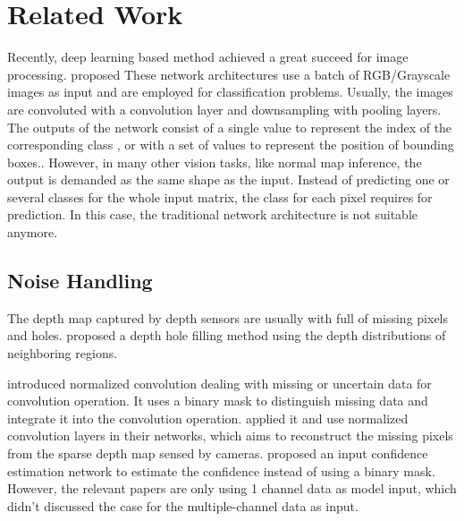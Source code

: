 
\chapter{Related Work} %

\label{ch:02} %





Recently, deep learning based method achieved a great succeed for image processing.  \cite{yolov3} proposed  \cite{efficientDet} These network architectures use a batch of RGB/Grayscale images as input and are employed for classification problems. Usually, the images are convoluted with a convolution layer and downsampling with pooling layers. The outputs of the network consist of a single value to represent the index of the corresponding class \cite{efficientDet}, or with a set of values to represent the position of bounding boxes.\cite{yolov3}. However, in many other vision tasks, like normal map inference, the output is demanded as the same shape as the input. Instead of predicting one or several classes for the whole input matrix, the class for each pixel requires for prediction. In this case, the traditional network architecture is not suitable anymore.



\section{Noise Handling}
The depth map captured by depth sensors are usually with full of missing pixels and holes.
\cite{depth-inpainting-distribution} proposed a depth hole filling method using the depth distributions of neighboring regions. 

\cite{nconv} introduced normalized convolution dealing with missing or uncertain data for convolution operation. It uses a binary mask to distinguish missing data and integrate it into the convolution operation. \cite{ncnn} applied it and use normalized convolution layers in their networks, which aims to reconstruct the missing pixels from the sparse depth map sensed by cameras. \cite{pncnn} proposed an input confidence estimation network to estimate the confidence instead of using a binary mask. However, the relevant papers are only using 1 channel data as model input, which didn't discussed the case for the multiple-channel data as input.

